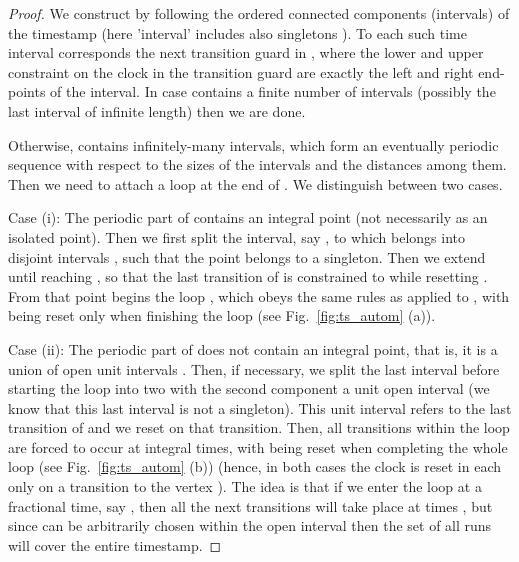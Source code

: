 \documentclass[11pt]{amsart}
\theoremstyle{definition}
\begin{document}
\begin{proof}
We construct  by following the ordered connected components (intervals) of the timestamp  (here 'interval' includes also singletons ).
To each such time interval corresponds the next transition guard in , where the lower and upper constraint on the clock  in the transition guard are exactly the left and right end-points of the interval.
In case  contains a finite number of intervals (possibly the last interval of infinite length) then we are done.

Otherwise,  contains infinitely-many intervals, which form an eventually periodic sequence with respect to the sizes of the intervals and the distances among them. 
Then we need to attach a loop at the end of .
We distinguish between two cases.

Case (i): The periodic part of  contains an integral point  (not necessarily as an isolated point).
Then we first split the interval, say , to which  belongs into disjoint intervals , such that the point  belongs to a singleton. 
Then we extend  until reaching , so that the last transition of  is constrained to  while resetting . 
From that point begins the loop , which obeys the same rules as applied to , with  being reset only when finishing the loop (see Fig.~\ref{fig:ts_autom} (a)).

Case (ii): The periodic part of  does not contain an integral point, that is, it is a union of open unit intervals .
Then, if necessary, we split the last interval before starting the loop into two with the second component a unit open interval (we know that this last interval is not a singleton).
This unit interval refers to the last transition of  and we reset  on that transition. 
Then, all transitions within the loop  are forced to occur at integral times, with  being reset when completing the whole loop (see Fig.~\ref{fig:ts_autom} (b)) (hence, in both cases the clock  is reset in each  only on a transition to the vertex ).
The idea is that if we enter the loop at a fractional time, say , then all the next transitions will take place at times , but since  can be arbitrarily chosen within the open interval  then the set of all runs will cover the entire timestamp.
\end{proof}
\end{document}
